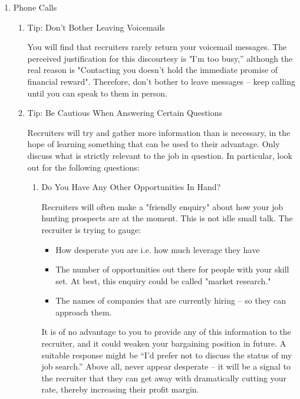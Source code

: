\documentclass{article}
\begin{document}
\begin{enumerate}
\item Phone Calls
\label{sec:orgheadline116}

\begin{enumerate}
\item Tip: Don't Bother Leaving Voicemails
\label{sec:orgheadline103}

You will find that recruiters rarely return your voicemail messages. The
perceived justification for this discourtesy is "I'm too busy,” although
the real reason is "Contacting you doesn't hold the immediate promise of
financial reward". Therefore, don't bother to leave messages -- keep
calling until you can speak to them in person.

\item Tip: Be Cautious When Answering Certain Questions
\label{sec:orgheadline109}

Recruiters will try and gather more information than is necessary, in
the hope of learning something that can be used to their advantage. Only
discuss what is strictly relevant to the job in question. In particular,
look out for the following questions:

\begin{enumerate}
\item Do You Have Any Other Opportunities In Hand?
\label{sec:orgheadline104}

Recruiters will often make a "friendly enquiry" about how your job
hunting prospects are at the moment. This is not idle small talk. The
recruiter is trying to gauge:

\begin{itemize}
\item How desperate you are i.e. how much leverage they have
\item The number of opportunities out there for people with your skill set.
At best, this enquiry could be called "market research."
\item The names of companies that are currently hiring -- so they can
approach them.
\end{itemize}

It is of no advantage to you to provide any of this information to the
recruiter, and it could weaken your bargaining position in future. A
suitable response might be “I'd prefer not to discuss the status of my
job search.” Above all, never appear desperate -- it will be a signal to
the recruiter that they can get away with dramatically cutting your
rate, thereby increasing their profit margin.


\end{enumerate}
\end{enumerate}
\end{enumerate}
\end{document}
